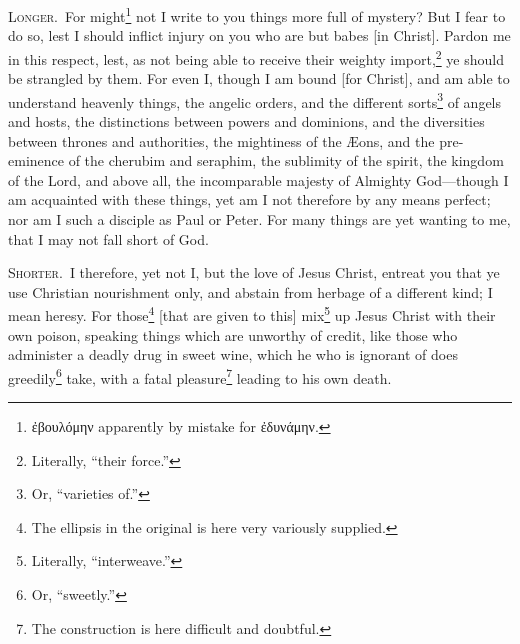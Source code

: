 \textsc{Longer.}~For might\footnote{\textgreek{ἐβουλόμην} apparently by mistake for \textgreek{ἐδυνάμην}.} not I write to you things more full of mystery? But I fear to do so, lest I should inflict injury on you who are but babes [in Christ]. Pardon me in this respect, lest, as not being able to receive their weighty import,\footnote{Literally, “their force.”} ye should be strangled by them. For even I, though I am bound [for Christ], and am able to understand heavenly things, the angelic orders, and the different sorts\footnote{Or, “varieties of.”} of angels and hosts, the distinctions between powers and dominions, and the diversities between thrones and authorities, the mightiness of the Æons, and the pre-eminence of the cherubim and seraphim, the sublimity of the spirit, the kingdom of the Lord, and above all, the incomparable majesty of Almighty God—though I am acquainted with these things, yet am I not therefore by any means perfect; nor am I such a disciple as Paul or Peter. For many things are yet wanting to me, that I may not fall short of God.


\textsc{Shorter.}~I therefore, yet not I, but the love of Jesus Christ, entreat you that ye use Christian nourishment only, and abstain from herbage of a different kind; I mean heresy. For those\footnote{The ellipsis in the original is here very variously supplied.} [that are given to this] mix\footnote{Literally, “interweave.”} up Jesus Christ with their own poison, speaking things which are unworthy of credit, like those who administer a deadly drug in sweet wine, which he who is ignorant of does greedily\footnote{Or, “sweetly.”} take, with a fatal pleasure\footnote{The construction is here difficult and doubtful.} leading to his own death.

